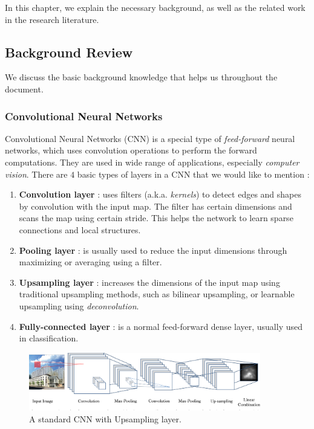 In this chapter, we explain the necessary background, as well as the related work in the research literature.

\subsection{Background Review}
We discuss the basic background knowledge that helps us throughout the document.

\subsubsection{Convolutional Neural Networks}
Convolutional Neural Networks (CNN) is a special type of \emph{feed-forward} neural networks, which uses convolution operations to perform the forward computations. They are used in wide range of applications, especially \emph{computer vision}. There are $4$ basic types of layers in a CNN that we would like to mention :
\begin{enumerate}
    \item \textbf{Convolution layer} : uses filters (a.k.a. \emph{kernels}) to detect edges and shapes by convolution with the input map. The filter has certain dimensions and scans the map using certain stride. This helps the network to learn sparse connections and local structures.
    \item \textbf{Pooling layer} : is usually used to reduce the input dimensions through maximizing or averaging using a filter.
    \item \textbf{Upsampling layer} : increases the dimensions of the input map using traditional upsampling methods, such as bilinear upsampling, or learnable upsampling using \emph{deconvolution}.
    \item \textbf{Fully-connected layer} : is a normal feed-forward dense layer, usually used in classification.
\end{enumerate}

\begin{figure}[H]
    \centering
    \includegraphics[width=0.9\textwidth]{images/cnn.png}
    \caption{A standard CNN with Upsampling layer.}
    \label{fig:cnn}
\end{figure}

